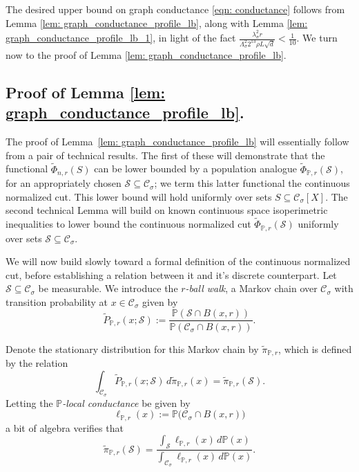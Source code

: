 \documentclass[11pt,twoside]{article}
\theoremstyle{definition}
\newcommand{\1}{\mathbbm{1}}
\newcommand{\Pbb}{\mathbb{P}}
\newcommand{\Sset}{\mathcal{S}}
\newcommand{\Cset}{\mathcal{C}}
\newcommand{\Csig}{\Cset_{\sigma}}
\newcommand{\piwt}{\widetilde{\pi}}
\begin{document}
The desired upper bound on graph conductance \eqref{eqn: conductance} follows from Lemma \ref{lem: graph_conductance_profile_lb}, along with Lemma \ref{lem: graph_conductance_profile_lb_1}, in light of the fact $\frac{\lambda_{\sigma}^2 r}{\Lambda_{\sigma}^2 2^{13} \rho L \sqrt{d}} < \frac{1}{10}$. We turn now to the proof of Lemma \ref{lem: graph_conductance_profile_lb}.

\subsection{Proof of Lemma \ref{lem: graph_conductance_profile_lb}.}

The proof of Lemma~\ref{lem: graph_conductance_profile_lb} will essentially follow from a pair of technical results. The first of these will demonstrate that the functional $\widetilde{\Phi}_{n,r}(S)$ can be lower bounded by a population analogue $\widetilde{\Phi}_{\Pbb,r}(\Sset)$, for an appropriately chosen $\Sset \subseteq \Csig$; we term this latter functional the continuous normalized cut. This lower bound will hold uniformly over sets $S \subseteq \Csig[X]$. The second technical Lemma will build on known continuous space isoperimetric inequalities to lower bound the continuous normalized cut $\widetilde{\Phi}_{\Pbb,r}(\Sset)$ uniformly over sets $\Sset \subseteq \Csig$.

We will now build slowly toward a formal definition of the continuous normalized cut, before establishing a relation between it and it's discrete counterpart. Let $\Sset \subseteq \Csig$ be measurable. We introduce the \emph{$r$-ball walk}, a Markov chain over $\Csig$ with transition probability at $x \in \Csig$ given by 
\begin{equation*}
\widetilde{P}_{\Pbb,r}(x; \Sset) := \frac{\Pbb(\Sset \cap B(x,r))}{\Pbb(\Csig \cap B(x,r))}.
\end{equation*}

Denote the stationary distribution for this Markov chain by $\piwt_{\Pbb,r}$, which is defined by the relation
\begin{equation*}
\int_{\Csig} \widetilde{P}_{\Pbb,r}(x; \Sset) \,d \piwt_{\Pbb,r}(x) = \piwt_{\Pbb,r}(\Sset).
\end{equation*}
Letting the \emph{$\Pbb$-local conductance} be given by
\begin{equation*}
\ell_{\Pbb,r}(x) := \Pbb\bigl(\Csig \cap B(x,r)\bigr)
\end{equation*}
a bit of algebra verifies that
\begin{equation*}
\piwt_{\Pbb,r}(\Sset) = \frac{\int_{\Sset} \ell_{\Pbb,r}(x) \,d \Pbb(x) }{\int_{\Csig} \ell_{\Pbb,r}(x) \,d \Pbb(x)}.
\end{equation*}
\end{document}
